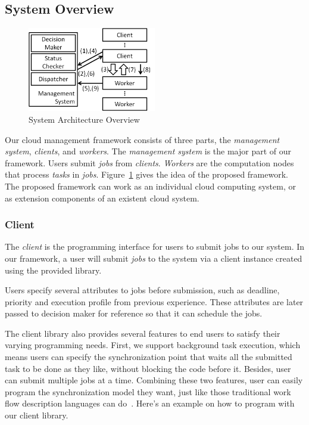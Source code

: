 \subsection{System Overview}	%

\begin{figure}[htbp]
\centering
\includegraphics[width = 0.5\textwidth, bb=0 0 490 350]{./figures/flow.png}
\caption{System Architecture Overview}
\label{fig:archi-overview}
\end{figure}

Our cloud management framework consists of three parts, the {\em
management system}, {\em clients}, and {\em workers}.
The {\em management system} is the major part of our framework.  Users
submit {\em jobs} from {\em clients}.
{\em Workers} are the computation nodes that process {\em tasks} in {\em
jobs}.
Figure~\ref{fig:archi-overview} gives the idea of the proposed
framework.
The proposed framework can work as an individual cloud computing system,
or as extension components of an existent cloud system.

\subsubsection{Client}	%

The {\em client} is the programming interface for users to submit jobs
to our system.
In our framework, a user will submit {\em jobs} to the system via a
client instance created using the provided library.

Users specify several attributes to jobs before submission, such as
deadline, priority and execution profile from previous experience.
These attributes are later passed to decision maker for reference so
that it can schedule the jobs.

The client library also provides several features to end users to
satisfy their varying programming needs.
First, we support background task execution, which means users can
specify the synchronization point that waits all the submitted task to
be done as they like, without blocking the code before it.
Besides, user can submit multiple jobs at a time.
Combining these two features, user can easily program the
synchronization model they want, just like those traditional work flow
description languages can do~\cite{cite:workflow-management}.
Here's an example on how to program with our client library.

